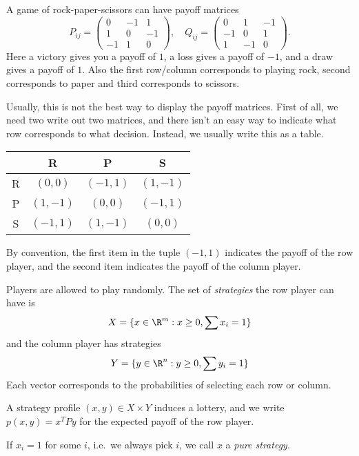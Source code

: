 \documentclass[a4paper]{article}
\begin{document}
\begin{eg}
  A game of rock-paper-scissors can have payoff matrices
  \[
    P_{ij} =
    \begin{pmatrix}
      0 & -1 & 1\\
      1 & 0 & -1\\
      -1 & 1 & 0
    \end{pmatrix},\quad
    Q_{ij} =
    \begin{pmatrix}
      0 & 1 & -1\\
      -1 & 0 & 1\\
      1 & -1 & 0
    \end{pmatrix}.
  \]
  Here a victory gives you a payoff of $1$, a loss gives a payoff of $-1$, and a draw gives a payoff of $1$. Also the first row/column corresponds to playing rock, second corresponds to paper and third corresponds to scissors.

  Usually, this is not the best way to display the payoff matrices. First of all, we need two write out two matrices, and there isn't an easy way to indicate what row corresponds to what decision. Instead, we usually write this as a table.
  \begin{center}
    \begin{tabular}{cccc}
      \toprule
      & R & P & S\\
      \midrule
      R & $(0, 0)$ & $(-1, 1)$ & $(1, -1)$\\
      P & $(1, -1)$ & $(0, 0)$ & $(-1, 1)$\\
      S & $(-1, 1)$ & $(1, -1)$ & $(0, 0)$\\
      \bottomrule
    \end{tabular}
  \end{center}
  By convention, the first item in the tuple $(-1, 1)$ indicates the payoff of the row player, and the second item indicates the payoff of the column player.
\end{eg}
\begin{defi}[Strategy]
  Players are allowed to play randomly. The set of \emph{strategies} the row player can have is
  \[
    X = \{x\in \R^m: x \geq 0, \sum x_i = 1\}
  \]
  and the column player has strategies
  \[
    Y = \{y\in \R^n: y \geq 0, \sum y_i = 1\}
  \]
  Each vector corresponds to the probabilities of selecting each row or column.

  A strategy profile $(x, y)\in X\times Y$ induces a lottery, and we write $p(x, y) = x^T Py$ for the expected payoff of the row player.

  If $x_i = 1$ for some $i$, i.e.\ we always pick $i$, we call $x$ a \emph{pure strategy}.
\end{defi}
\end{document}
